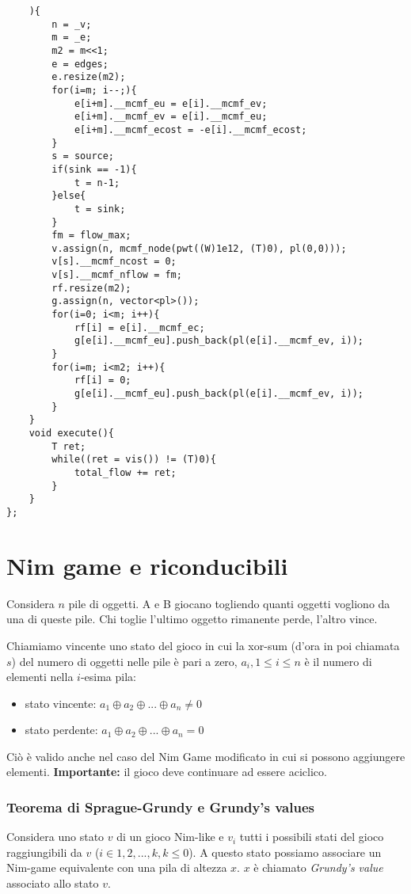 \documentclass[a4paper,landscape,8pt]{extarticle}
\begin{document}
\begin{multicols}{3}
\begin{lstlisting}
    ){
        n = _v;
        m = _e;
        m2 = m<<1;
        e = edges;
        e.resize(m2);
        for(i=m; i--;){
            e[i+m].__mcmf_eu = e[i].__mcmf_ev;
            e[i+m].__mcmf_ev = e[i].__mcmf_eu;
            e[i+m].__mcmf_ecost = -e[i].__mcmf_ecost;
        }
        s = source;
        if(sink == -1){
            t = n-1;
        }else{
            t = sink;
        }
        fm = flow_max;
        v.assign(n, mcmf_node(pwt((W)1e12, (T)0), pl(0,0)));
        v[s].__mcmf_ncost = 0;
        v[s].__mcmf_nflow = fm;
        rf.resize(m2);
        g.assign(n, vector<pl>());
        for(i=0; i<m; i++){
            rf[i] = e[i].__mcmf_ec;
            g[e[i].__mcmf_eu].push_back(pl(e[i].__mcmf_ev, i));
        }
        for(i=m; i<m2; i++){
            rf[i] = 0;
            g[e[i].__mcmf_eu].push_back(pl(e[i].__mcmf_ev, i));
        }
    }
    void execute(){
        T ret;
        while((ret = vis()) != (T)0){
            total_flow += ret;
        }
    }
};
\end{lstlisting}

\section*{Nim game e riconducibili}

Considera $n$ pile di oggetti. A e B giocano togliendo quanti oggetti vogliono
da una di queste pile. Chi toglie l'ultimo oggetto rimanente perde, l'altro
vince.

Chiamiamo vincente uno stato del gioco in cui la xor-sum (d'ora in poi chiamata
$s$) del numero di oggetti nelle pile è pari a zero, $a_i, 1 \leq i \leq n$ è
il numero di elementi nella $i$-esima pila:
\begin{itemize}
    \item stato vincente: $a_1 \oplus a_2 \oplus ... \oplus a_n \neq 0$
    \item stato perdente: $a_1 \oplus a_2 \oplus ... \oplus a_n = 0$
\end{itemize}

Ciò è valido anche nel caso del Nim Game modificato in cui si possono aggiungere
elementi. \textbf{Importante:} il gioco deve continuare ad essere aciclico.

\subsubsection*{Teorema di Sprague-Grundy e Grundy's values}

Considera uno stato $v$ di un gioco Nim-like e $v_i$ tutti i possibili stati del
gioco raggiungibili da $v$ ($i \in {1, 2, ..., k}, k \leq 0$). A questo stato
possiamo associare un Nim-game equivalente con una pila di altezza $x$. $x$ è
chiamato \emph{Grundy's value} associato allo stato $v$.


\end{multicols}
\end{document}
